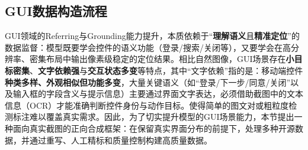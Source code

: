 \subsection{GUI数据构造流程}
GUI领域的Referring与Grounding能力提升，本质依赖于“\textbf{理解语义}且\textbf{精准定位}”的数据监督：模型既要学会控件的语义功能（登录/搜索/关闭等），又要学会在高分辨率、密集布局中输出像素级稳定的定位结果。相比自然图像，GUI场景存在\textbf{小目标密集}、\textbf{文字依赖强}与\textbf{交互状态多变}等特点，其中“文字依赖”指的是：移动端控件\textbf{种类多样、外观相似但功能多变}，大量关键语义（如“登录/下一步/同意/关闭”以及输入框的字段含义与提示信息）主要通过界面文字表达，必须借助截图中的文本信息（OCR）才能准确判断控件身份与动作目标。使得简单的图文对或粗粒度检测标注难以覆盖真实需求。因此，为了切实提升模型的GUI场景能力，本节提出一种面向真实截图的正向合成框架：在保留真实界面分布的前提下，处理多种开源数据，并通过重写、人工精标和质量控制构建高质量数据。

